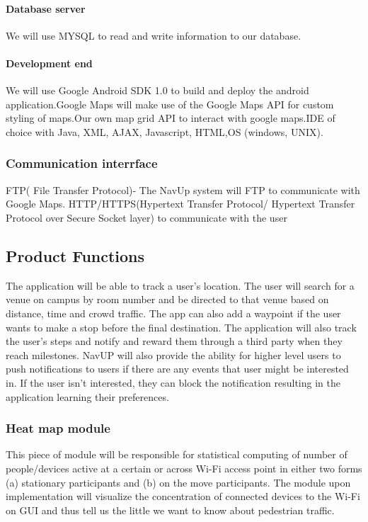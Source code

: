 \documentclass[11pt]{article}
\begin{document}
			\paragraph{Database server}	
      We will use MYSQL to read and write information to our database.

			\paragraph{Development end}
      We will use Google Android SDK 1.0 to build and deploy the android application.Google Maps will make use of the Google Maps API for custom styling of maps.Our own map grid API to interact with google maps.IDE of choice with Java, XML, AJAX, Javascript, HTML,OS (windows, UNIX).
      
		\subsubsection{Communication interrface}
    FTP( File Transfer Protocol)- The NavUp system will FTP to communicate with Google Maps.
    HTTP/HTTPS(Hypertext Transfer Protocol/ Hypertext Transfer Protocol over Secure Socket layer) to communicate with the user
        
		\subsection{Product Functions}
      The application will be able to track a user’s location. The user will search for a venue on campus by room number and 			be directed to that venue based on distance, time and crowd traffic. The app can also add a waypoint if the user wants 			to make a stop before the final destination. The application will also track the user’s steps and notify and reward them 		 through a third party when they reach milestones. NavUP will also provide the ability for higher level users to push 			notifications to users if there are any events that user might be interested in. If the user isn’t interested, they can 		block the notification resulting in the application learning their preferences. 
			\subsubsection{Heat map module}
			This piece of module will be responsible for statistical computing of number of people/devices active at a certain or across Wi-Fi access point in either two forms (a) stationary participants and (b) on the move participants. The module upon implementation will visualize the concentration of connected devices to the Wi-Fi on GUI and thus tell us the little we want to know about pedestrian traffic.
\end{document}
